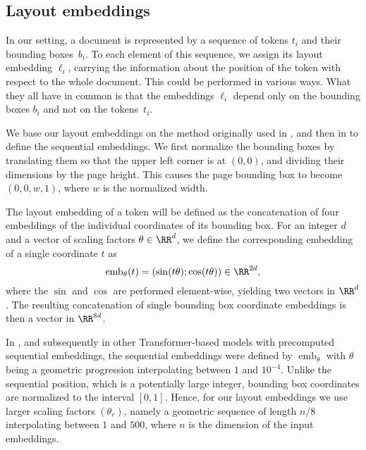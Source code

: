 \subsection{Layout embeddings}
\label{sec:context-embeddings}

In our setting, a document is represented by a sequence of tokens \(t_i\) and
their bounding boxes~\(b_i\). To each element of this sequence, we assign its
layout embedding \(\ell_i\), carrying the information about the position of the
token with respect to the whole document. This could be performed in various
ways. What they all have in common is that the embeddings \(\ell_i\) depend only
on the bounding boxes \(b_i\) and not on the tokens~\(t_i\).

We base our layout embeddings on the method originally used in
\citep{gehring2017convolutional}, and then in \citep{Vaswani2017-transformer} to
define the sequential embeddings. We first normalize the bounding boxes by
translating them so that the upper left corner is at \((0,0)\), and dividing
their dimensions by the page height. This causes the page bounding box to become
\((0, 0, w, 1)\), where \(w\) is the normalized width.

The layout embedding of a token will be defined as the concatenation of four
embeddings of the individual coordinates of its bounding box. For an integer
\(d\) and a vector of scaling factors \(\theta\in\RR^{d}\), we define the
corresponding embedding of a single coordinate \(t\) as
\begin{equation}
  \operatorname{emb_{\theta}}(t) = (\sin(t\theta); \cos(t\theta)) \in \RR^{2d},
\end{equation}
where the \(\sin\) and \(\cos\) are performed element-wise, yielding two vectors
in \(\RR^{d}\). The resulting concatenation of single bounding box coordinate
embeddings is then a vector in \(\RR^{8d}\).

In \citep[Section~3.5]{Vaswani2017-transformer}, and subsequently in other
Transformer-based models with precomputed sequential embeddings, the sequential
embeddings were defined by \(\operatorname{emb}_{\theta}\) with \(\theta\) being
a geometric progression interpolating between \(1\) and \(10^{-4}\). Unlike the
sequential position, which is a potentially large integer, bounding box
coordinates are normalized to the interval \([0,1]\). Hence, for our layout
embeddings we use larger scaling factors \((\theta_r)\), namely a geometric
sequence of length \(n/8\) interpolating between \(1\) and \(500\), where \(n\)
is the dimension of the input embeddings.

